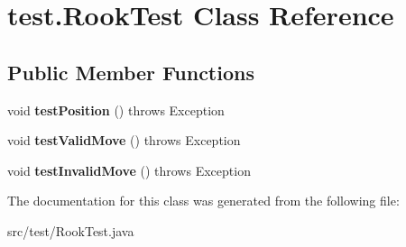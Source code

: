 \hypertarget{classtest_1_1_rook_test}{}\section{test.\+Rook\+Test Class Reference}
\label{classtest_1_1_rook_test}
\subsection*{Public Member Functions}
\begin{DoxyCompactItemize}
\item 
\mbox{\label{classtest_1_1_rook_test_a12762a0f3bc2a9f2ac4d7fa2178beb45}} 
void {\bfseries test\+Position} ()  throws Exception 
\item 
\mbox{\label{classtest_1_1_rook_test_a7c7fad4bba4ee9fa3bfb099824aff7ba}} 
void {\bfseries test\+Valid\+Move} ()  throws Exception 
\item 
\mbox{\label{classtest_1_1_rook_test_acf986d8d88f1638cdbfc369eaa5783b0}} 
void {\bfseries test\+Invalid\+Move} ()  throws Exception 
\end{DoxyCompactItemize}


The documentation for this class was generated from the following file\+:\begin{DoxyCompactItemize}
\item 
src/test/Rook\+Test.\+java\end{DoxyCompactItemize}
